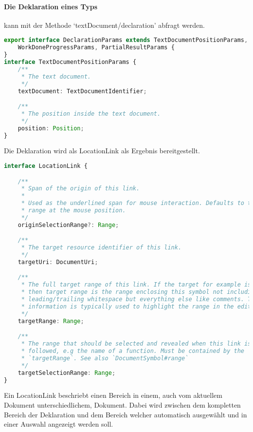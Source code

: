 \documentclass[./einleitung.tex]{subfiles}
\begin{document}
    \paragraph{Die Deklaration eines Typs} kann mit der Methode `textDocument/declaration' abfragt werden.
    \begin{lstlisting}[language=Typescript, title=Definition der Parameter \cite{declaration}, caption=Definition der Deklarations-Parameter \cite{declaration}, label=lst:declarationParams]
export interface DeclarationParams extends TextDocumentPositionParams,
	WorkDoneProgressParams, PartialResultParams {
}
interface TextDocumentPositionParams {
	/**
	 * The text document.
	 */
	textDocument: TextDocumentIdentifier;

	/**
	 * The position inside the text document.
	 */
	position: Position;
}
    \end{lstlisting}
    Die Deklaration wird als LocationLink als Ergebnis bereitgestellt.
    \begin{lstlisting}[language=Typescript, title=Definition des LocationLink \cite{declaration}, label=lst:locationLink]
interface LocationLink {

	/**
	 * Span of the origin of this link.
	 *
	 * Used as the underlined span for mouse interaction. Defaults to the word
	 * range at the mouse position.
	 */
	originSelectionRange?: Range;

	/**
	 * The target resource identifier of this link.
	 */
	targetUri: DocumentUri;

	/**
	 * The full target range of this link. If the target for example is a symbol
	 * then target range is the range enclosing this symbol not including
	 * leading/trailing whitespace but everything else like comments. This
	 * information is typically used to highlight the range in the editor.
	 */
	targetRange: Range;

	/**
	 * The range that should be selected and revealed when this link is being
	 * followed, e.g the name of a function. Must be contained by the
	 * `targetRange`. See also `DocumentSymbol#range`
	 */
	targetSelectionRange: Range;
}
    \end{lstlisting}
    Ein LocationLink beschriebt einen Bereich in einem, auch vom aktuellem Dokument unterschiedlichem, Dokument.
    Dabei wird zwischen dem kompletten Bereich der Deklaration und dem Bereich welcher automatisch ausgewählt und in einer Auswahl angezeigt werden soll.
\end{document}
